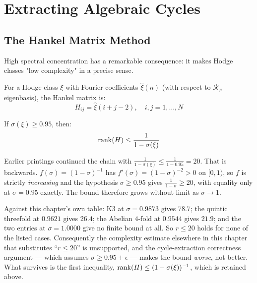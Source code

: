 \section{Extracting Algebraic Cycles}

\subsection{The Hankel Matrix Method}

High spectral concentration has a remarkable consequence: it makes Hodge classes "low complexity" in a precise sense.

\begin{defn}\label{def:hankel-matrix}
For a Hodge class $\xi$ with Fourier coefficients $\hat{\xi}(n)$ (with respect to $\mathcal{R}_\varphi$ eigenbasis), the Hankel matrix is:
\begin{equation}
H_{ij} = \hat{\xi}(i+j-2), \quad i,j = 1, \ldots, N
\end{equation}
\end{defn}

\begin{theorem}\label{thm:low-rank}
If $\sigma(\xi) \geq 0.95$, then:
\begin{equation}
\operatorname{rank}(H) \leq \frac{1}{1-\sigma(\xi)}
\end{equation}
\end{theorem}

\begin{remark}
\label{rem:low-rank-direction-2026-10-03}
Earlier printings continued the chain with
$\tfrac{1}{1-\sigma(\xi)} \leq \tfrac{1}{1-0.95} = 20$. That is backwards.
$f(\sigma) = (1-\sigma)^{-1}$ has $f'(\sigma) = (1-\sigma)^{-2} > 0$ on $[0,1)$,
so $f$ is strictly \emph{increasing} and the hypothesis $\sigma \geq 0.95$ gives
$\tfrac{1}{1-\sigma} \geq 20$, with equality only at $\sigma = 0.95$ exactly.
The bound therefore grows without limit as $\sigma \to 1$.

Against this chapter's own table: K3 at $\sigma = 0.9873$ gives $78.7$; the
quintic threefold at $0.9621$ gives $26.4$; the Abelian $4$-fold at $0.9544$
gives $21.9$; and the two entries at $\sigma = 1.0000$ give no finite bound at
all. So $r \leq 20$ holds for none of the listed cases. Consequently the
complexity estimate elsewhere in this chapter that substitutes ``$r \leq 20$''
is unsupported, and the cycle-extraction correctness argument --- which assumes
$\sigma \geq 0.95 + \epsilon$ --- makes the bound \emph{worse}, not better. What
survives is the first inequality, $\operatorname{rank}(H) \leq (1-\sigma(\xi))^{-1}$, which is
retained above.
\end{remark}

